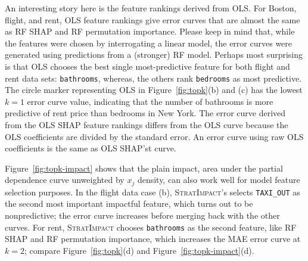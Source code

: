 \documentclass[11pt]{article}
\newcommand{\figref}[1]{Figure~\ref{#1}}
\newcommand{\simp}{\fontfamily{cmr}\textsc{\small StratImpact}}
\begin{document}
An interesting story here is the feature rankings derived from OLS. For Boston, flight, and rent, OLS feature rankings give error curves that are almost the same as RF SHAP and RF permutation importance.  Please keep in mind that, while the features were chosen by interrogating a linear model, the error curves were generated using predictions from a (stronger) RF model.  Perhaps most surprising is that OLS chooses the best single most-predictive feature for both flight and rent data sets: {\tt bathrooms}, whereas, the others rank {\tt bedrooms} as most predictive. The circle marker representing OLS in \figref{fig:topk}(b) and (c) has the lowest $k=1$ error curve value, indicating that the number of bathrooms  is more predictive of rent price than bedrooms in New York. The error curve derived from the OLS SHAP feature rankings differs from the OLS curve because the OLS coefficients are divided by the standard error. An error curve using raw OLS coefficients is the same as OLS SHAP'st curve.

\figref{fig:topk-impact} shows that the plain impact, area under the partial dependence curve unweighted by $x_j$ density, can also work well for model feature selection purposes. In the flight data case (b), \simp's selects {\tt TAXI\_OUT} as the second most important impactful feature, which turns out to be nonpredictive; the error curve increases before merging back with the other curves. For rent, \simp{} chooses {\tt bathrooms} as the second feature, like RF SHAP and RF permutation importance, which increases the MAE error curve at $k=2$; compare \figref{fig:topk}(d) and \figref{fig:topk-impact}(d).
\end{document}
